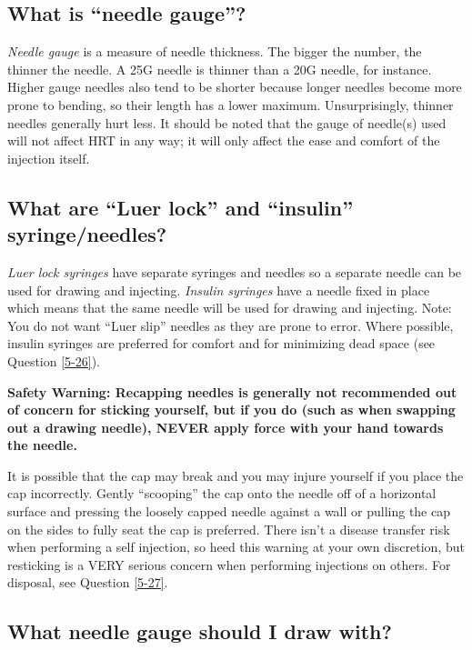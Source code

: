 \documentclass{article}
\begin{document}
\subsection{What is “needle gauge”?}

\textit{Needle gauge} is a measure of needle thickness. The bigger the number, the thinner the needle. A 25G needle is thinner than a 20G needle, for instance. Higher gauge needles also tend to be shorter because longer needles become more prone to bending, so their length has a lower maximum. Unsurprisingly, thinner needles generally hurt less. It should be noted that the gauge of needle(s) used will not affect HRT in any way; it will only affect the ease and comfort of the injection itself.

\subsection{What are “Luer lock” and “insulin” syringe/needles?}\label{5-13}

\textit{Luer lock syringes} have separate syringes and needles so a separate needle can be used for drawing and injecting. \textit{Insulin syringes} have a needle fixed in place which means that the same needle will be used for drawing and injecting. Note: You do not want “Luer slip” needles as they are prone to error. Where possible, insulin syringes are preferred for comfort and for minimizing dead space (see Question \ref{5-26}).

\textbf{Safety Warning: Recapping needles is generally not recommended out of concern for sticking yourself, but if you do (such as when swapping out a drawing needle), NEVER apply force with your hand towards the needle.}

It is possible that the cap may break and you may injure yourself if you place the cap incorrectly. Gently “scooping” the cap onto the needle off of a horizontal surface and pressing the loosely capped needle against a wall or pulling the cap on the sides to fully seat the cap is preferred. There isn't a disease transfer risk when performing a self injection, so heed this warning at your own discretion, but resticking is a VERY serious concern when performing injections on others. For disposal, see Question \ref{5-27}.

\subsection{What needle gauge should I draw with?}
\end{document}
